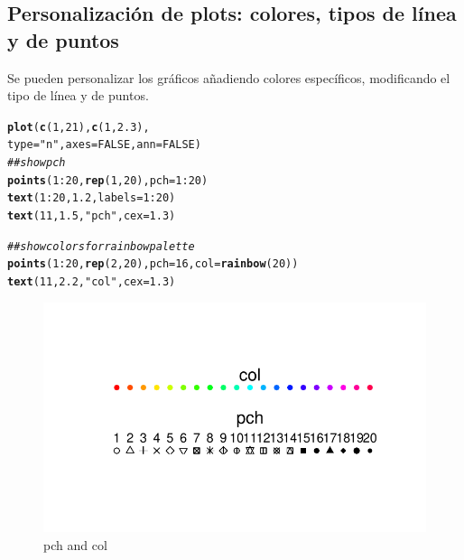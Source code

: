 \documentclass{config/apuntes}\usepackage[]{graphicx}\usepackage[]{xcolor}
\makeatletter
\def\maxwidth{ %
  \ifdim\Gin@nat@width>\linewidth
    \linewidth
  \else
    \Gin@nat@width
  \fi
}
\newcommand{\hlnum}[1]{\textcolor[rgb]{0.686,0.059,0.569}{#1}}%
\newcommand{\hlsng}[1]{\textcolor[rgb]{0.192,0.494,0.8}{#1}}%
\newcommand{\hlcom}[1]{\textcolor[rgb]{0.678,0.584,0.686}{\textit{#1}}}%
\newcommand{\hlopt}[1]{\textcolor[rgb]{0,0,0}{#1}}%
\newcommand{\hldef}[1]{\textcolor[rgb]{0.345,0.345,0.345}{#1}}%
\newcommand{\hlkwc}[1]{\textcolor[rgb]{0.333,0.667,0.333}{#1}}%
\newcommand{\hlkwd}[1]{\textcolor[rgb]{0.737,0.353,0.396}{\textbf{#1}}}%
\newenvironment{kframe}{%
 \def\at@end@of@kframe{}%
 \ifinner\ifhmode%
  \def\at@end@of@kframe{\end{minipage}}%
  \begin{minipage}{\columnwidth}%
 \fi\fi%
 \def\FrameCommand##1{\hskip\@totalleftmargin \hskip-\fboxsep
 \colorbox{shadecolor}{##1}\hskip-\fboxsep
     \hskip-\linewidth \hskip-\@totalleftmargin \hskip\columnwidth}%
 \MakeFramed {\advance\hsize-\width
   \@totalleftmargin\z@ \linewidth\hsize
   \@setminipage}}%
 {\par\unskip\endMakeFramed%
 \at@end@of@kframe}
\newenvironment{knitrout}{}{} %
\makeatother
\begin{document}
\subsection{Personalización de plots: colores, tipos de línea y de puntos}
Se pueden personalizar los gráficos añadiendo colores específicos, modificando el tipo de línea y de puntos.
\begin{knitrout}
\color{fgcolor}\begin{kframe}
\begin{alltt}
\hlkwd{plot}\hldef{(}\hlkwd{c}\hldef{(}\hlnum{1}\hldef{,} \hlnum{21}\hldef{),} \hlkwd{c}\hldef{(}\hlnum{1}\hldef{,} \hlnum{2.3}\hldef{),}
     \hlkwc{type} \hldef{=} \hlsng{"n"}\hldef{,} \hlkwc{axes} \hldef{=} \hlnum{FALSE}\hldef{,} \hlkwc{ann} \hldef{=} \hlnum{FALSE}\hldef{)}
\hlcom{## show pch}
\hlkwd{points}\hldef{(}\hlnum{1}\hlopt{:}\hlnum{20}\hldef{,} \hlkwd{rep}\hldef{(}\hlnum{1}\hldef{,} \hlnum{20}\hldef{),} \hlkwc{pch} \hldef{=} \hlnum{1}\hlopt{:}\hlnum{20}\hldef{)}
\hlkwd{text}\hldef{(}\hlnum{1}\hlopt{:}\hlnum{20}\hldef{,} \hlnum{1.2}\hldef{,} \hlkwc{labels} \hldef{=} \hlnum{1}\hlopt{:}\hlnum{20}\hldef{)}
\hlkwd{text}\hldef{(}\hlnum{11}\hldef{,} \hlnum{1.5}\hldef{,} \hlsng{"pch"}\hldef{,} \hlkwc{cex} \hldef{=} \hlnum{1.3}\hldef{)}

\hlcom{## show colors for rainbow palette}
\hlkwd{points}\hldef{(}\hlnum{1}\hlopt{:}\hlnum{20}\hldef{,} \hlkwd{rep}\hldef{(}\hlnum{2}\hldef{,} \hlnum{20}\hldef{),} \hlkwc{pch} \hldef{=} \hlnum{16}\hldef{,} \hlkwc{col} \hldef{=} \hlkwd{rainbow}\hldef{(}\hlnum{20}\hldef{))}
\hlkwd{text}\hldef{(}\hlnum{11}\hldef{,} \hlnum{2.2}\hldef{,} \hlsng{"col"}\hldef{,} \hlkwc{cex} \hldef{=} \hlnum{1.3}\hldef{)}
\end{alltt}
\end{kframe}\begin{figure}
\includegraphics[width=\maxwidth]{figure/pchcol-1} \caption[pch and col]{pch and col}\label{fig:pchcol}
\end{figure}

\end{knitrout}
\end{document}
